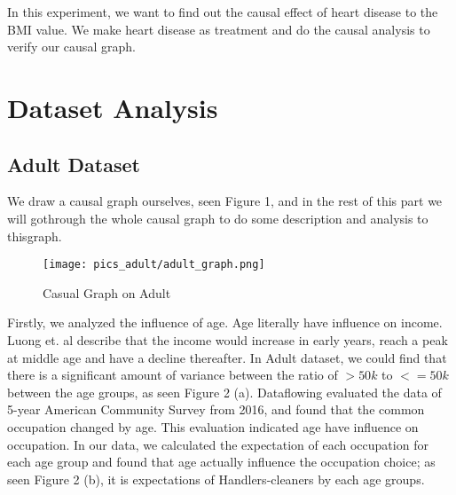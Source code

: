 \documentclass[letterpaper,12pt]{article}
\begin{document}
In this experiment, we want to find out the causal effect of heart disease to the BMI value. We make heart disease as treatment and do the causal analysis to verify our causal graph.\par


\section{Dataset Analysis}

\subsection{Adult Dataset}
We  draw  a  causal  graph  ourselves, seen Figure 1,  and  in  the  rest  of  this  part  we  will  gothrough the whole causal graph to do some description and analysis to thisgraph.\par
\begin{figure}[htb]
\centering
\texttt{[image: pics\_adult/adult\_graph.png]}
\caption{Casual Graph on Adult}
\label{fig:pathdemo}
\end{figure}


Firstly, we analyzed the influence of age. Age literally have influence on income. Luong et. al\cite{luong2009age} describe that the income would increase in early years, reach a peak at middle age and have a decline thereafter. In Adult dataset, we could find that there is a significant amount of variance between the ratio of $>50k$ to $<=50k$ between the age groups, as seen Figure 2 (a). Dataflowing\cite{occ-age} evaluated the data of 5-year American Community Survey from 2016, and found that the common occupation changed by age. This evaluation indicated age have influence on occupation. In our data, we calculated the expectation of each occupation for each age group and found that age actually influence the occupation choice; as seen Figure 2 (b), it is expectations of Handlers-cleaners by each age groups.\par
\end{document}
